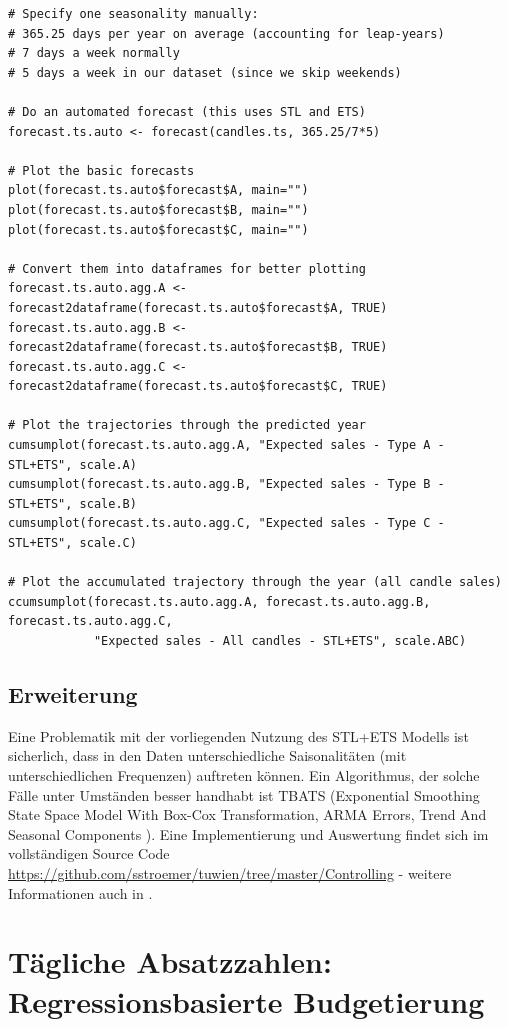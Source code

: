 \documentclass[a4paper,11pt]{article}
\begin{document}
\begin{lstlisting}
# Specify one seasonality manually:
# 365.25 days per year on average (accounting for leap-years)
# 7 days a week normally
# 5 days a week in our dataset (since we skip weekends)

# Do an automated forecast (this uses STL and ETS)
forecast.ts.auto <- forecast(candles.ts, 365.25/7*5)

# Plot the basic forecasts
plot(forecast.ts.auto$forecast$A, main="")
plot(forecast.ts.auto$forecast$B, main="")
plot(forecast.ts.auto$forecast$C, main="")

# Convert them into dataframes for better plotting
forecast.ts.auto.agg.A <- forecast2dataframe(forecast.ts.auto$forecast$A, TRUE)
forecast.ts.auto.agg.B <- forecast2dataframe(forecast.ts.auto$forecast$B, TRUE)
forecast.ts.auto.agg.C <- forecast2dataframe(forecast.ts.auto$forecast$C, TRUE)

# Plot the trajectories through the predicted year
cumsumplot(forecast.ts.auto.agg.A, "Expected sales - Type A - STL+ETS", scale.A)
cumsumplot(forecast.ts.auto.agg.B, "Expected sales - Type B - STL+ETS", scale.B)
cumsumplot(forecast.ts.auto.agg.C, "Expected sales - Type C - STL+ETS", scale.C)

# Plot the accumulated trajectory through the year (all candle sales)
ccumsumplot(forecast.ts.auto.agg.A, forecast.ts.auto.agg.B, forecast.ts.auto.agg.C,
            "Expected sales - All candles - STL+ETS", scale.ABC)
\end{lstlisting}

\subsection{Erweiterung}

Eine Problematik mit der vorliegenden Nutzung des STL+ETS Modells ist sicherlich, dass in den Daten unterschiedliche Saisonalitäten (mit unterschiedlichen Frequenzen) auftreten können. Ein Algorithmus, der solche Fälle unter Umständen besser handhabt ist TBATS (Exponential Smoothing State Space Model With Box-Cox Transformation, ARMA Errors, Trend And Seasonal Components \cite{de2011forecasting}). Eine Implementierung und Auswertung findet sich im vollständigen Source Code \url{https://github.com/sstroemer/tuwien/tree/master/Controlling} - weitere Informationen auch in \cite{tbats}.

\newpage
\section{Tägliche Absatzzahlen: Regressionsbasierte Budgetierung}
\end{document}
